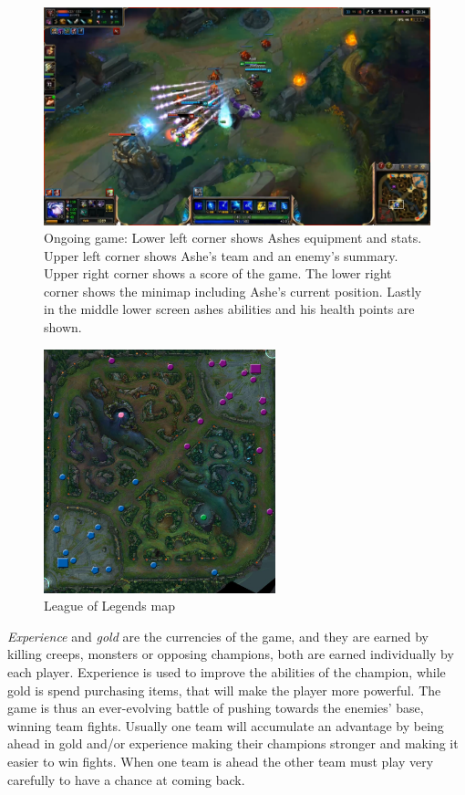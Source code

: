 \begin{figure}[!htb]
  \centering
    \includegraphics[width=1\textwidth]{img/lolgame.png}
  \caption{Ongoing game: Lower left corner shows Ashes equipment and stats. Upper left corner shows Ashe's team and an enemy's summary. Upper right corner shows a score of the game. The lower right corner shows the minimap including Ashe's current position. Lastly in the middle lower screen ashes abilities and his health points are shown.}\label{fig:lolgame}
\end{figure}

\begin{figure}[!htb]
  \centering
    \includegraphics[width=0.6\textwidth]{img/lolmap.jpg}
  \caption{League of Legends map~\cite{lolmap}}\label{fig:lolmap}
\end{figure}

\emph{Experience} and \emph{gold} are the currencies of the game, and they are earned by killing creeps, monsters or opposing champions, both are earned individually by each player. Experience is used to improve the abilities of the champion, while gold is spend purchasing items, that will make the player more powerful. The game is thus an ever-evolving battle of pushing towards the enemies' base, winning team fights. Usually one team will accumulate an advantage by being ahead in gold and/or experience making their champions stronger and making it easier to win fights. When one team is ahead the other team must play very carefully to have a chance at coming back. 


